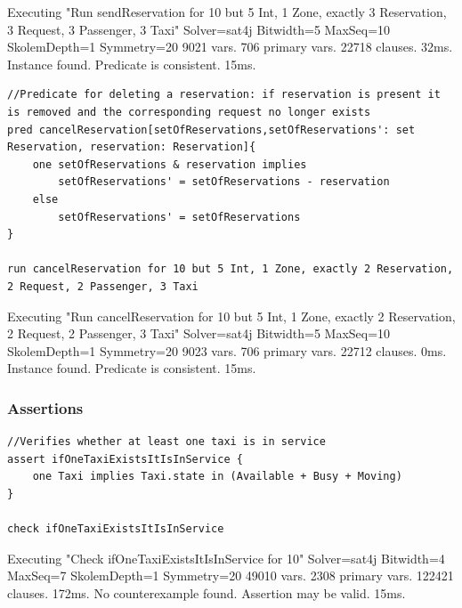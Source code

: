 \begin{framed}
Executing "Run sendReservation for 10 but 5 Int, 1 Zone, exactly 3 Reservation, 3 Request, 3 Passenger, 3 Taxi"    
Solver=sat4j Bitwidth=5 MaxSeq=10 SkolemDepth=1 Symmetry=20    
9021 vars. 706 primary vars. 22718 clauses. 32ms.    
Instance found. Predicate is consistent. 15ms. 
\end{framed}

\begin{lstlisting}[breaklines=true,showstringspaces=false]
//Predicate for deleting a reservation: if reservation is present it is removed and the corresponding request no longer exists 
pred cancelReservation[setOfReservations,setOfReservations': set Reservation, reservation: Reservation]{ 	
	one setOfReservations & reservation implies
		setOfReservations' = setOfReservations - reservation  	
	else 		
		setOfReservations' = setOfReservations	 
}

run cancelReservation for 10 but 5 Int, 1 Zone, exactly 2 Reservation, 2 Request, 2 Passenger, 3 Taxi
\end{lstlisting}


\begin{framed}
Executing "Run cancelReservation for 10 but 5 Int, 1 Zone, exactly 2 Reservation, 2 Request, 2 Passenger, 3 Taxi"    
Solver=sat4j Bitwidth=5 MaxSeq=10 SkolemDepth=1 Symmetry=20    
9023 vars. 706 primary vars. 22712 clauses. 0ms.    
Instance found. Predicate is consistent. 15ms.
\end{framed}


\subsubsection{Assertions}

\begin{lstlisting}[breaklines=true,showstringspaces=false]
//Verifies whether at least one taxi is in service 
assert ifOneTaxiExistsItIsInService { 	
	one Taxi implies Taxi.state in (Available + Busy + Moving) 
}

check ifOneTaxiExistsItIsInService
\end{lstlisting}


\begin{framed}
Executing "Check ifOneTaxiExistsItIsInService for 10"    
Solver=sat4j Bitwidth=4 MaxSeq=7 SkolemDepth=1 Symmetry=20    
49010 vars. 2308 primary vars. 122421 clauses. 172ms.    
No counterexample found. Assertion may be valid. 15ms. 
\end{framed}

